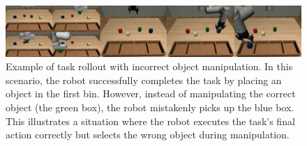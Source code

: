 \begin{figure}[t]
    \centering
    \includegraphics[width=1.0\textwidth]{figures/images/baseline_pick_place_error/pick_place_trj.png}
    \caption{Example of task rollout with incorrect object manipulation. In this scenario, the robot successfully completes the task by placing an object in the first bin. However, instead of manipulating the correct object (the green box), the robot mistakenly picks up the blue box. This illustrates a situation where the robot executes the task's final action correctly but selects the wrong object during manipulation.}
    \label{fig:baseline_pick_place_error}
\end{figure}
